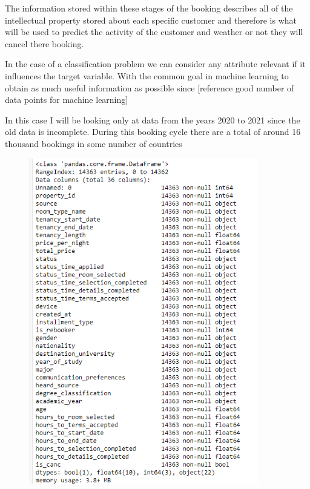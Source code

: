 The information stored within these stages of the booking describes all of the intellectual property stored about each specific customer and therefore is what will be used to predict the activity of the customer and weather or not they will cancel there booking. 

In the case of a classification problem we can consider any attribute relevant if it influences the target variable. With the common goal in machine learning to obtain as much useful information as possible since [reference good number of data points for machine learning]

In this case I will be looking only at data from the years 2020 to 2021 since the old data is incomplete. During this booking cycle there are a total of around 16 thousand bookings  in some number of countries 

\begin{figure}[hbt!]
 \includegraphics[width=10cm]{figures/df_info.png}
 \caption{}
\end{figure}

